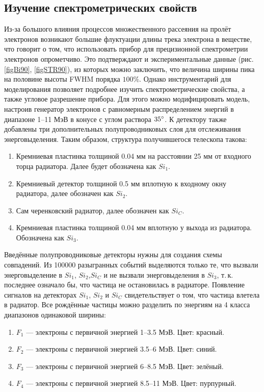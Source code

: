 \documentclass[12pt,a4paper]{report} %
\begin{document}
\subsection{Изучение спектрометрических свойств}
Из-за большого влияния процессов множественного рассеяния на пролёт электронов возникают большие флуктуации длины трека электрона в веществе, что говорит о том, что использовать прибор для прецизионной спектрометрии электронов опрометчиво. Это подтверждают и экспериментальные данные (рис. \ref{figBi90}, \ref{figSTR90}), из которых можно заключить, что величина ширины пика на половине высоты FWHM порядка $100\%$. Однако инструментарий для моделирования позволяет подробнее изучить спектрометрические свойства, а также угловое разрешение прибора. Для этого можно модифицировать модель, настроив генератор электронов с равномерным распределением энергий в диапазоне  1--11 МэВ в конусе с углом раствора $35\degree$.
К детектору также добавлены три дополнительных полупроводниковых слоя для отслеживания энерговыделения. Таким образом, структура получившегося телескопа такова:
\begin{enumerate}
	\item Кремниевая пластинка толщиной 0.04 мм на расстоянии 25 мм от входного торца радиатора. Далее будет обозначена как $Si_1$.
	\item Кремниевый детектор толщиной 0.5 мм вплотную к входному окну радиатора, далее обозначен как $Si_2$.
	\item Сам черенковский радиатор, далее обозначен как $Si_C$.
	\item Кремниевая пластинка толщиной 0.04 мм вплотную у выхода из радиатора. Обозначена как $Si_3$.
\end{enumerate}
Введённые полупроводниковые детекторы нужны для создания схемы совпадений. Из 100000 разыгранных событий выделяются только те, что вызвали энерговыделение в $Si_1$, $Si_2$,$Si_C$ и не вызвали энерговыделения в $Si_3$, т.\,к. последнее означало бы, что частица не остановилась в радиаторе. Появление сигналов на детекторах $Si_1$, $Si_2$ и $Si_C$ свидетельствует о том, что частица влетела в радиатор. 
Все рождённые частицы можно разделить по энергиям на 4 класса диапазонов одинаковой ширины:
\begin{enumerate}
	\item $F_1$ --- электроны с первичной энергией 1--3.5 МэВ. Цвет: красный.
	\item $F_2$ --- электроны с первичной энергией 3.5--6 МэВ. Цвет: синий.
	\item $F_3$ --- электроны с первичной энергией 6--8.5 МэВ. Цвет: зелёный.
	\item $F_4$ --- электроны с первичной энергией 8.5--11 МэВ. Цвет: пурпурный.
\end{enumerate}
\end{document}
